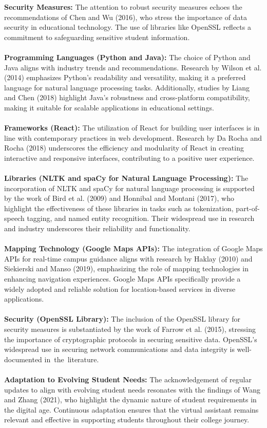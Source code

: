 \documentclass[12pt,a4paper]{report}
\begin{document}
\textbf{Security Measures:}
The attention to robust security measures echoes the recommendations of Chen and Wu (2016), who stress the importance of data security in educational technology. The use of libraries like OpenSSL reflects a commitment to safeguarding sensitive student information.\\ \\
\textbf{Programming Languages (Python and Java):}
The choice of Python and Java aligns with industry trends and recommendations. Research by Wilson et al. (2014) emphasizes Python's readability and versatility, making it a preferred language for natural language processing tasks. Additionally, studies by Liang and Chen (2018) highlight Java's robustness and cross-platform compatibility, making it suitable for scalable applications in educational settings.\\ \\
\textbf{Frameworks (React):}
The utilization of React for building user interfaces is in line with contemporary practices in web development. Research by Da Rocha and Rocha (2018) underscores the efficiency and modularity of React in creating interactive and responsive interfaces, contributing to a positive user experience.\\ \\
\textbf{Libraries (NLTK and spaCy for Natural Language Processing):}
The incorporation of NLTK and spaCy for natural language processing is supported by the work of Bird et al. (2009) and Honnibal and Montani (2017), who highlight the effectiveness of these libraries in tasks such as tokenization, part-of-speech tagging, and named entity recognition. Their widespread use in research and industry underscores their reliability and functionality.\\ \\
\textbf{Mapping Technology (Google Maps APIs):}
The integration of Google Maps APIs for real-time campus guidance aligns with research by Haklay (2010) and Siekierski and Manso (2019), emphasizing the role of mapping technologies in enhancing navigation experiences. Google Maps APIs specifically provide a widely adopted and reliable solution for location-based services in diverse applications.\\ \\
\textbf{Security (OpenSSL Library):}
The inclusion of the OpenSSL library for security measures is substantiated by the work of Farrow et al. (2015), stressing the importance of cryptographic protocols in securing sensitive data. OpenSSL's widespread use in securing network communications and data integrity is well-documented in the literature.\\\\
\textbf{Adaptation to Evolving Student Needs:}
The acknowledgement of regular updates to align with evolving student needs resonates with the findings of Wang and Zhang (2021), who highlight the dynamic nature of student requirements in the digital age. Continuous adaptation ensures that the virtual assistant remains relevant and effective in supporting students throughout their college journey. 
\end{document}
